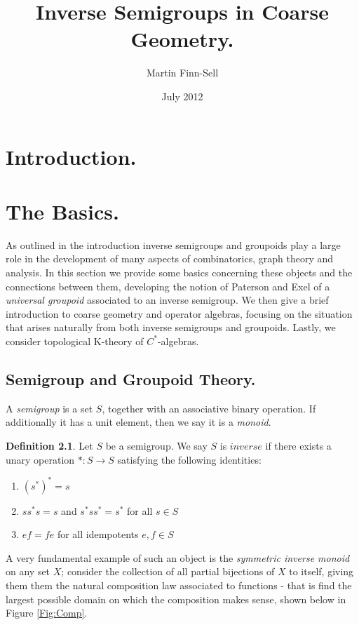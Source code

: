 \documentclass[11pt,]{amsbook}
\title{Inverse Semigroups in Coarse Geometry.}
\date{July 2012}
\author{Martin Finn-Sell}
\theoremstyle{plain}
\theoremstyle{definition}%
\newtheorem{definition}[theorem]{Definition}%
\theoremstyle{remark}%
\begin{document}
\maketitle
\tableofcontents


\chapter{Introduction.}

\chapter{The Basics.}
As outlined in the introduction inverse semigroups and groupoids play a large role in the development of many aspects of combinatorics, graph theory and analysis. In this section we provide some basics concerning these objects and the connections between them, developing the notion of Paterson and Exel of a \textit{universal groupoid} associated to an inverse semigroup. We then give a brief introduction to coarse geometry and operator algebras, focusing on the situation that arises naturally from both inverse semigroups and groupoids. Lastly, we consider topological K-theory of $C^{*}$-algebras.

\section{Semigroup and Groupoid Theory.}

A \textit{semigroup} is a set $S$, together with an associative binary operation. If additionally it has a unit element, then we say it is a \textit{monoid}.

\begin{definition}\label{Def:invsemi}
Let $S$ be a semigroup. We say $S$ is $inverse$ if there exists a unary operation $*:S \rightarrow S$ satisfying the following identities:
\begin{enumerate}
\item $(s^{*})^{*}=s$
\item $ss^{*}s=s$ and $s^{*}ss^{*}=s^{*}$ for all $s \in S$
\item $ef=fe$ for all idempotents $e,f \in S$ 
\end{enumerate}
\end{definition}

A very fundamental example of such an object is the \textit{symmetric inverse monoid} on any set $X$; consider the collection of all partial bijections of $X$ to itself, giving them them the natural composition law associated to functions - that is find the largest possible domain on which the composition makes sense, shown below in Figure \ref{Fig:Comp}.
\end{document}

